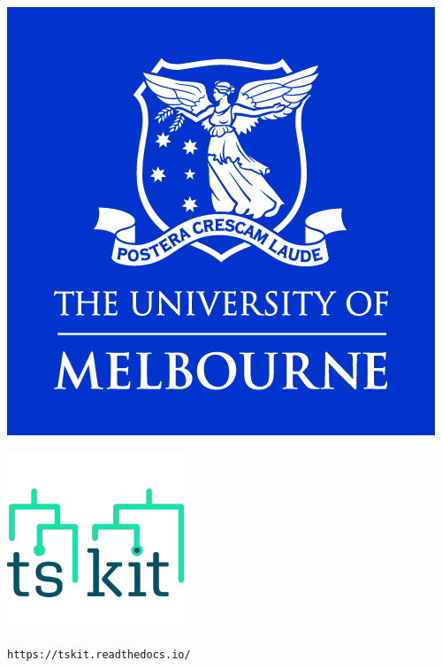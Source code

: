 \documentclass[11pt, mathserif, aspectratio=169]{beamer}
\begin{document}
\begin{frame}
\begin{minipage}{.4\linewidth}
\begin{minipage}{.35\linewidth}
\includegraphics[scale=.35]{pics/unimelb-logo.jpg}
\end{minipage}\begin{minipage}{.2\linewidth}
\includegraphics[scale=.3]{pics/tskit-logo.png}
\end{minipage}
\flushright
\texttt{https://tskit.readthedocs.io/}
\end{minipage}
\end{frame}
\end{document}
